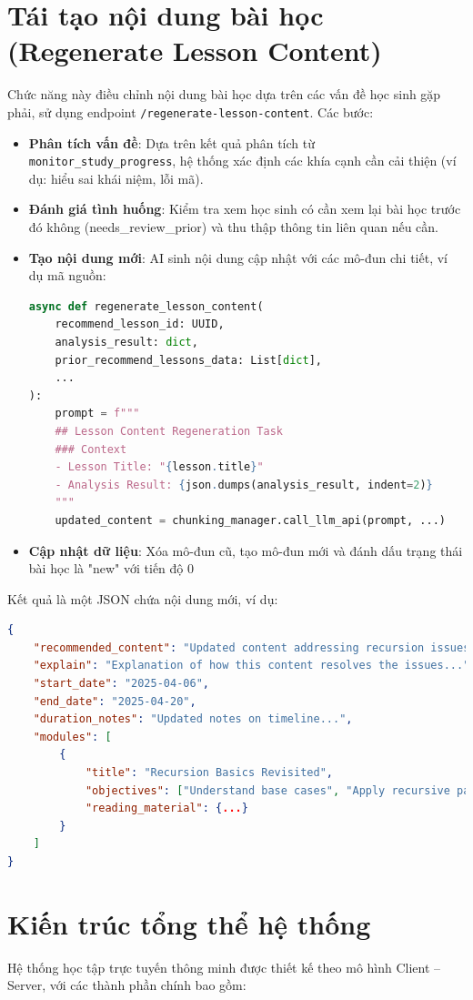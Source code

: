 \section{Tái tạo nội dung bài học (Regenerate Lesson Content)}
Chức năng này điều chỉnh nội dung bài học dựa trên các vấn đề học sinh gặp phải, sử dụng endpoint \texttt{/regenerate-lesson-content}. Các bước:
\begin{itemize}
    \item \textbf{Phân tích vấn đề}: Dựa trên kết quả phân tích từ \texttt{monitor\_study\_progress}, hệ thống xác định các khía cạnh cần cải thiện (ví dụ: hiểu sai khái niệm, lỗi mã).
    \item \textbf{Đánh giá tình huống}: Kiểm tra xem học sinh có cần xem lại bài học trước đó không (needs\_review\_prior) và thu thập thông tin liên quan nếu cần.
    \item \textbf{Tạo nội dung mới}: AI sinh nội dung cập nhật với các mô-đun chi tiết, ví dụ mã nguồn:
    \begin{lstlisting}[language=Python]
async def regenerate_lesson_content(
    recommend_lesson_id: UUID,
    analysis_result: dict,
    prior_recommend_lessons_data: List[dict],
    ...
):
    prompt = f"""
    ## Lesson Content Regeneration Task
    ### Context
    - Lesson Title: "{lesson.title}"
    - Analysis Result: {json.dumps(analysis_result, indent=2)}
    """
    updated_content = chunking_manager.call_llm_api(prompt, ...)
    \end{lstlisting}
    \item \textbf{Cập nhật dữ liệu}: Xóa mô-đun cũ, tạo mô-đun mới và đánh dấu trạng thái bài học là "new" với tiến độ 0%
\end{itemize}
Kết quả là một JSON chứa nội dung mới, ví dụ:
\begin{lstlisting}[language=JSON]
{
    "recommended_content": "Updated content addressing recursion issues...",
    "explain": "Explanation of how this content resolves the issues...",
    "start_date": "2025-04-06",
    "end_date": "2025-04-20",
    "duration_notes": "Updated notes on timeline...",
    "modules": [
        {
            "title": "Recursion Basics Revisited",
            "objectives": ["Understand base cases", "Apply recursive patterns"],
            "reading_material": {...}
        }
    ]
}
\end{lstlisting}

\section{Kiến trúc tổng thể hệ thống}
Hệ thống học tập trực tuyến thông minh được thiết kế theo mô hình Client – Server, với các thành phần chính bao gồm:

